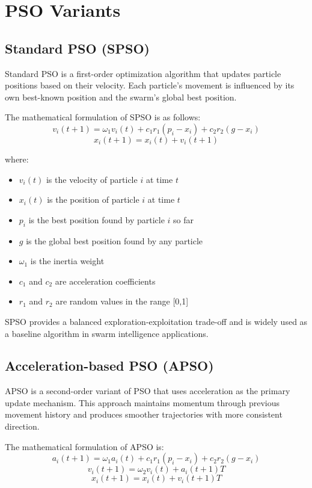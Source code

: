 \documentclass[conference]{IEEEtran}
\begin{document}
\section{PSO Variants}
\subsection{Standard PSO (SPSO)}
Standard PSO is a first-order optimization algorithm that updates particle positions based on their velocity. Each particle's movement is influenced by its own best-known position and the swarm's global best position.

The mathematical formulation of SPSO is as follows:
\begin{equation}
v_i(t+1) = \omega_1 v_i(t) + c_1 r_1(p_i - x_i) + c_2r_2(g-x_i)
\end{equation}
\begin{equation}
x_i(t+1) = x_i(t) + v_i(t+1)
\end{equation}

where:
\begin{itemize}
    \item $v_i(t)$ is the velocity of particle $i$ at time $t$
    \item $x_i(t)$ is the position of particle $i$ at time $t$
    \item $p_i$ is the best position found by particle $i$ so far
    \item $g$ is the global best position found by any particle
    \item $\omega_1$ is the inertia weight
    \item $c_1$ and $c_2$ are acceleration coefficients
    \item $r_1$ and $r_2$ are random values in the range [0,1]
\end{itemize}

SPSO provides a balanced exploration-exploitation trade-off and is widely used as a baseline algorithm in swarm intelligence applications.

\subsection{Acceleration-based PSO (APSO)}
APSO is a second-order variant of PSO that uses acceleration as the primary update mechanism. This approach maintains momentum through previous movement history and produces smoother trajectories with more consistent direction.

The mathematical formulation of APSO is:
\begin{equation}
a_i(t+1) = \omega_1 a_i(t) + c_1 r_1(p_i - x_i) + c_2r_2(g-x_i)
\end{equation}
\begin{equation}
v_i(t+1) = \omega_2v_i(t) + a_i(t+1)T
\end{equation}
\begin{equation}
x_i(t+1) = x_i(t) + v_i(t+1)T
\end{equation}
\end{document}
